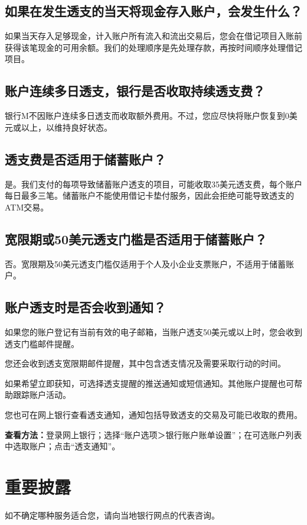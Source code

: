 \documentclass[UTF8,fontset=none,11pt,a4paper]{ctexart}
\begin{document}
\subsection*{如果在发生透支的当天将现金存入账户，会发生什么？}
如果当天存入足够现金，计入账户所有流入和流出交易后，您会在借记项目入账前获得该笔现金的可用余额。我们的处理顺序是先处理存款，再按时间顺序处理借记项目。


\subsection*{账户连续多日透支，银行是否收取持续透支费？}
银行M不因账户连续多日透支而收取额外费用。不过，您应尽快将账户恢复到0美元或以上，以维持良好状态。


\subsection*{透支费是否适用于储蓄账户？}
是。我们支付的每项导致储蓄账户透支的项目，可能收取35美元透支费，每个账户每日最多三笔。储蓄账户不能使用借记卡垫付服务，因此会拒绝可能导致透支的ATM交易。


\subsection*{宽限期或50美元透支门槛是否适用于储蓄账户？}
否。宽限期及50美元透支门槛仅适用于个人及小企业支票账户，不适用于储蓄账户。


\subsection*{账户透支时是否会收到通知？}
如果您的账户登记有当前有效的电子邮箱，当账户透支50美元或以上时，您会收到透支门槛邮件提醒。


您还会收到透支宽限期邮件提醒，其中包含透支情况及需要采取行动的时间。


如果希望立即获知，可选择透支提醒的推送通知或短信通知。其他账户提醒也可帮助跟踪账户活动。


您也可在网上银行查看透支通知，通知包括导致透支的交易及可能已收取的费用。


\textbf{查看方法：}登录网上银行；选择“账户选项＞银行账户账单设置”；在可选账户列表中选取账户；点击“透支通知”。


\section*{重要披露}
如不确定哪种服务适合您，请向当地银行网点的代表咨询。
\end{document}
